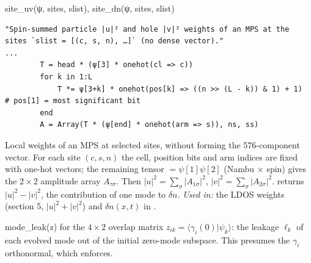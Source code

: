 \begin{function}{site\_uv(ψ, sites, slist), site\_dn(ψ, sites, slist)}
\begin{Verbatim}
"Spin-summed particle |u|² and hole |v|² weights of an MPS at the sites `slist = [(c, s, n), …]` (no dense vector)."
...
        T = head * (ψ[3] * onehot(cl => c))
        for k in 1:L
            T *= ψ[3+k] * onehot(pos[k] => ((n >> (L - k)) & 1) + 1)      # pos[1] = most significant bit
        end
        A = Array(T * (ψ[end] * onehot(arm => s)), ns, ss)
\end{Verbatim}
Local weights of an MPS at selected sites, without forming the 576-component vector. For each site $(c,s,n)$ the cell, position bits
and arm indices are fixed with one-hot vectors; the remaining tensor  $=\psi[1]\psi[2]$ (Nambu $\times$ spin) gives the
$2\times2$ amplitude array $A_{\tau\sigma}$. Then $|u|^2 = \sum_\sigma|A_{1\sigma}|^2$, $|v|^2 = \sum_\sigma|A_{2\sigma}|^2$.
 returns $|u|^2 - |v|^2$, the contribution of one mode to $\delta n$. \emph{Used in:} the LDOS weights (section 5,
$|u|^2+|v|^2$) and $\delta n(x,t)$ in .
\end{function}

\begin{function}{mode\_leak(z)}
 for the $4\times2$ overlap matrix
$z_{ik} = \langle\gamma_i(0)|\psi_k\rangle$: the leakage $\ell_k$ of each evolved mode out of the initial zero-mode subspace. This presumes
the $\gamma_i$ orthonormal, which  enforces.
\end{function}

